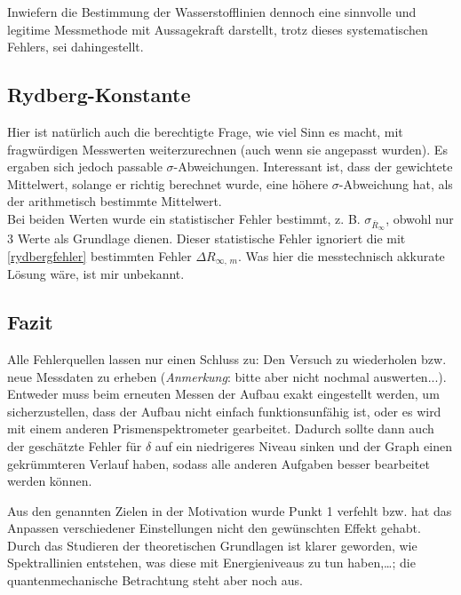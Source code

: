 Inwiefern die Bestimmung der Wasserstofflinien dennoch eine sinnvolle und legitime Messmethode mit Aussagekraft darstellt, trotz dieses systematischen Fehlers, sei dahingestellt.

\subsection{Rydberg-Konstante}
Hier ist natürlich auch die berechtigte Frage, wie viel Sinn es macht, mit fragwürdigen Messwerten weiterzurechnen (auch wenn sie angepasst wurden). Es ergaben sich jedoch passable \(\sigma\)-Abweichungen. Interessant ist, dass der gewichtete Mittelwert, solange er richtig berechnet wurde, eine höhere \(\sigma\)-Abweichung hat, als der arithmetisch bestimmte Mittelwert.\\
Bei beiden Werten wurde ein statistischer Fehler bestimmt, z. B. \(\sigma_{\bar{R}_\infty}\), obwohl nur 3 Werte als Grundlage dienen. Dieser statistische Fehler ignoriert die mit \cref{rydbergfehler} bestimmten Fehler \(\Delta R_{\infty,\,m}\). Was hier die messtechnisch akkurate Lösung wäre, ist mir unbekannt.

\subsection{Fazit}
Alle Fehlerquellen lassen nur einen Schluss zu: Den Versuch zu wiederholen bzw. neue Messdaten zu erheben (\emph{Anmerkung}: bitte aber nicht nochmal auswerten...). Entweder muss beim erneuten Messen der Aufbau exakt eingestellt werden, um sicherzustellen, dass der Aufbau nicht einfach funktionsunfähig ist, oder es wird mit einem anderen Prismenspektrometer gearbeitet. Dadurch sollte dann auch der geschätzte Fehler für \(\delta\) auf ein niedrigeres Niveau sinken und der Graph einen gekrümmteren Verlauf haben, sodass alle anderen Aufgaben besser bearbeitet werden können.

Aus den genannten Zielen in der Motivation wurde Punkt 1 verfehlt bzw. hat das Anpassen verschiedener Einstellungen nicht den gewünschten Effekt gehabt.\\
Durch das Studieren der theoretischen Grundlagen ist klarer geworden, wie Spektrallinien entstehen, was diese mit Energieniveaus zu tun haben,\dots; die quantenmechanische Betrachtung steht aber noch aus.